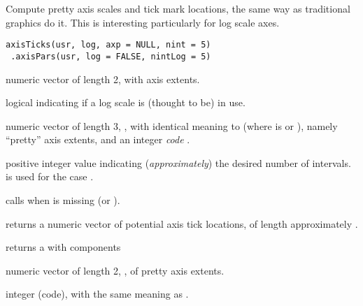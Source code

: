 %
\begin{Description}\relax
Compute pretty axis scales and tick mark locations, the same way as
traditional \R{} graphics do it.  This is interesting particularly for
log scale axes.
\end{Description}
%
\begin{Usage}
\begin{verbatim}
axisTicks(usr, log, axp = NULL, nint = 5)
 .axisPars(usr, log = FALSE, nintLog = 5)
\end{verbatim}
\end{Usage}
%
\begin{Arguments}
\begin{ldescription}
\item[\code{usr}] numeric vector of length 2, with  axis
extents.
\item[\code{log}] logical indicating if a log scale is (thought to be) in
use.
\item[\code{axp}] numeric vector of length 3, , with
identical meaning to  (where  is
 or ), namely ``pretty'' axis extents, and an
integer \emph{code} .


\item[\code{nint, nintLog}] positive integer value indicating
(\emph{approximately}) the desired number of intervals.
 is used  for the case .
\end{ldescription}
\end{Arguments}
%
\begin{Details}\relax
{} calls  when
 is missing (or ).

\end{Details}
%
\begin{Value}
 returns a numeric vector of potential axis tick
locations, of length approximately .

 returns a  with components
\begin{ldescription}
\item[\code{axp}] numeric vector of length 2, , of pretty
axis extents.
\item[\code{n}] integer (code), with the same meaning as
.
\end{ldescription}
\end{Value}
